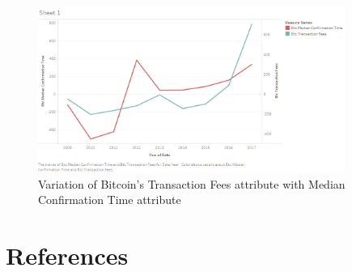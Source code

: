 \documentclass{article}
\begin{document}
\begin{itemize}
\begin{figure}[h]
    \centering
    \includegraphics[width=10cm]{btc_transaction_fees_avg_time.png}
    \caption{Variation of Bitcoin's Transaction Fees attribute with Median Confirmation Time attribute}
    \label{fig:my_label}
\end{figure}

\end{itemize}


\section{References}
\end{document}
